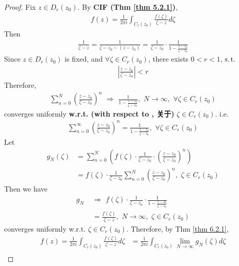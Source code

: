 \begin{thm}
	\begin{proof}
		Fix $z \in D_{r}(z_0)$. By \textbf{CIF (Thm \ref{thm 5.2.1})},
		\begin{align}
			f(z) = \frac{1}{2\pi i}\int_{C_{r}(z_0)}{\frac{f(\zeta)}{\zeta - z} d\zeta}
		\end{align}
		Then
		\begin{align}
			\frac{1}{\zeta - z} 
			= \frac{1}{\zeta - z_0 - (z - z_0)} 
			= \frac{1}{\zeta - z_0} \cdot \frac{1}{1 - \frac{z - z_0}{\zeta - z_0}} 
		\end{align}
		Since $z \in D_{r}(z_0)$ is fixed, and $\forall \zeta \in C_{r}(z_0)$, there exists $0 < r < 1$, $\operatorname{s.t.}$
		\begin{align}
			\left| \frac{z - z_0}{\zeta - z_0} \right| < r
		\end{align}
		Therefore,
		\begin{align}
			\sum_{n = 0}^{N}{\left( \frac{z - z_0}{\zeta - z_0} \right)^n} \,\, \Rightarrow \,\, \frac{1}{1 - \frac{z - z_0}{\zeta - z_0}} , \,\, N \to \infty , \,\, \forall \zeta \in C_{r}(z_0)
		\end{align}
		converges uniformly \textbf{w.r.t. (with respect to , 关于)} $\zeta \in C_{r}(z_0)$. i.e.
		\begin{align}
			\sum_{n = 0}^{\infty}{\left( \frac{z - z_0}{\zeta - z_0} \right)^n} = \frac{1}{1 - \frac{z - z_0}{\zeta - z_0}} , \,\, \forall \zeta \in C_{r}(z_0)
		\end{align}
		Let
		\begin{align}
			g_{N}(\zeta)
			&= \sum_{n = 0}^{N}{\left( f(\zeta) \cdot \frac{1}{\zeta - z_0} \cdot \left( \frac{z - z_0}{\zeta - z_0} \right)^n \right)} \\
			&= f(\zeta) \cdot \frac{1}{\zeta - z_0} \sum_{n = 0}^{N}{\left( \frac{z - z_0}{\zeta - z_0} \right)^n} , \,\, \zeta \in C_{r}(z_0)
		\end{align}
		Then we have
		\begin{align}
			g_{N} \,\, &\Rightarrow \,\, f(\zeta) \cdot \frac{1}{\zeta - z_0} \cdot \frac{1}{1 - \frac{z - z_0}{\zeta - z_0}} \\
			&= \frac{f(\zeta)}{\zeta - z} , \,\, N \to \infty , \,\, \zeta \in C_{r}(z_0)
		\end{align}
		converges uniformly w.r.t. $\zeta \in C_{r}(z_0)$. Therefore, by Thm \ref{thm 6.2.1},
		\begin{align}
			f(z) 
			= \frac{1}{2\pi i}\int_{C_{r}(z_0)}{\frac{f(\zeta)}{\zeta - z} d\zeta}
			&= \frac{1}{2\pi i} \int_{C_{r}(z_0)}{\lim_{N \to \infty}{g_{N}(\zeta) d\zeta}} \\

\end{align}
\end{proof}
\end{thm}
